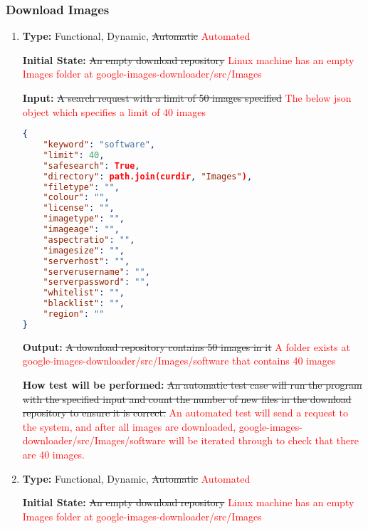 \documentclass[12pt, titlepage]{article}
\begin{document}
\subsubsection{Download Images}

\begin{enumerate}[label=FR-DL\arabic*:, wide=0pt, leftmargin=*]

\item \phantom{empty}

\textbf{Type:} Functional, Dynamic, \sout{Automatic} \textcolor{red}{Automated}

\textbf{Initial State:} \sout{An empty download repository}
\textcolor{red}{Linux machine has an empty Images folder at google-images-downloader/src/Images}

\textbf{Input:} \sout{A search request with a limit of 50 images specified}
\textcolor{red}{The below json object which specifies a limit of 40 images}
\begin{lstlisting}[language=json,firstnumber=1]
{
    "keyword": "software",
    "limit": 40,
    "safesearch": True,
    "directory": path.join(curdir, "Images"),
    "filetype": "",
    "colour": "",
    "license": "",
    "imagetype": "",
    "imageage": "",
    "aspectratio": "",
    "imagesize": "",
    "serverhost": "",
    "serverusername": "",
    "serverpassword": "",
    "whitelist": "",
    "blacklist": "",
    "region": ""
}
\end{lstlisting}

\textbf{Output:} \sout{A download repository contains 50 images in it}
\textcolor{red}{A folder exists at google-images-downloader/src/Images/software that contains 40 images}

\textbf{How test will be performed:} \sout{An automatic test case will run the program with the specified input 
and count the number of new files in the download repository to ensure it is correct.}
\textcolor{red}{An automated test will send a request to the system, and after all images are downloaded, 
google-images-downloader/src/Images/software will be iterated through to check that there are 40 images.}

\item \phantom{empty}

\textbf{Type:} Functional, Dynamic, \sout{Automatic} \textcolor{red}{Automated}
					
\textbf{Initial State:} \sout{An empty download repository}
\textcolor{red}{Linux machine has an empty Images folder at google-images-downloader/src/Images}
					

\end{enumerate}
\end{document}
